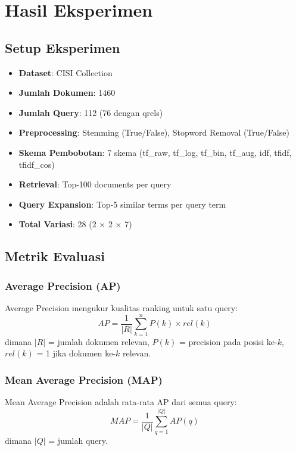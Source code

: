 \documentclass[12pt,a4paper]{report}
\begin{document}
\chapter{Hasil Eksperimen}

\section{Setup Eksperimen}
\begin{itemize}
    \item \textbf{Dataset}: CISI Collection
    \item \textbf{Jumlah Dokumen}: 1460
    \item \textbf{Jumlah Query}: 112 (76 dengan qrels)
    \item \textbf{Preprocessing}: Stemming (True/False), Stopword Removal (True/False)
    \item \textbf{Skema Pembobotan}: 7 skema (tf\_raw, tf\_log, tf\_bin, tf\_aug, idf, tfidf, tfidf\_cos)
    \item \textbf{Retrieval}: Top-100 documents per query
    \item \textbf{Query Expansion}: Top-5 similar terms per query term
    \item \textbf{Total Variasi}: 28 (2 $\times$ 2 $\times$ 7)
\end{itemize}

\section{Metrik Evaluasi}
\subsection{Average Precision (AP)}
Average Precision mengukur kualitas ranking untuk satu query:
\begin{equation}
    AP = \frac{1}{|R|} \sum_{k=1}^{n} P(k) \times rel(k)
\end{equation}
dimana $|R|$ = jumlah dokumen relevan, $P(k)$ = precision pada posisi ke-$k$, $rel(k)$ = 1 jika dokumen ke-$k$ relevan.

\subsection{Mean Average Precision (MAP)}
Mean Average Precision adalah rata-rata AP dari semua query:
\begin{equation}
    MAP = \frac{1}{|Q|} \sum_{q=1}^{|Q|} AP(q)
\end{equation}
dimana $|Q|$ = jumlah query.
\end{document}
